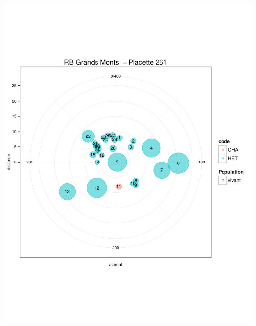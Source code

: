 \documentclass[a4paper]{book}\usepackage[]{graphicx}\usepackage[]{color}
\makeatletter
\def\maxwidth{ %
  \ifdim\Gin@nat@width>\linewidth
    \linewidth
  \else
    \Gin@nat@width
  \fi
}
\newenvironment{knitrout}{}{} %
\makeatother
\begin{document}
\begin{knitrout}
{\centering \includegraphics[width=\maxwidth]{Figures/PlanArbres-27} 

}





\end{knitrout}
\end{document}
